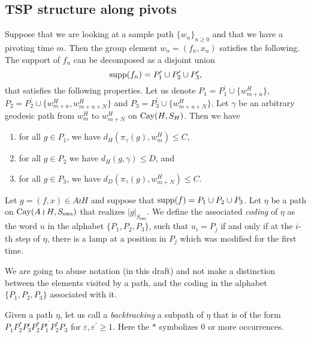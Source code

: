 \subsection{TSP structure along pivots}

\begin{prop}\label{prop: structure along pivots}
	Suppose that we are looking at a sample path $\{w_n\}_{n\ge 0}$ and that we have a pivoting time $m$. Then the group element $w_n=(f_n,x_n)$ satisfies the following. The support of $f_n$ can be decomposed as a disjoint union
	\[\mathrm{supp}(f_n)=P^{\prime}_1\cup P^{\prime}_2\cup P^{\prime}_3,\]
	that satisfies the following properties. Let us denote $P_1=P^{\prime}_1\cup\{w^{H}_{m+u}\}$, $P_2=P^{\prime}_2\cup \{w^{H}_{m+u}, w^{H}_{m+u+N}\}$ and  $P_3=P^{\prime}_3\cup \{w^{H}_{m+u+N}\}$. Let  $\gamma$ be an arbitrary geodesic path from $w_m^{H}$ to $w^{H}_{m+N}$ on $\mathrm{Cay}(H,S_H)$. Then we have
	\begin{enumerate}
		\item for all $g\in P_1$, we have $d_H\left( \pi_{\gamma}(g) ,w_m^H  \right)\le C$,
		\item for all $g\in P_2$ we have $d_H(g,\gamma)\le D$, and
		\item for all $g\in P_3$, we have $d_D\left( \pi_{\gamma}(g),w^H_{m+N} \right)\le C$.
	\end{enumerate}
\end{prop}


\begin{defin}
	 Let $g=(f,x)\in A\wr H$ and suppose that $\mathrm{supp}(f)=P_1\cup P_2\cup P_3$. Let $\eta$ be a path on $\mathrm{Cay}(A\wr H,S_{\mathrm{sws}})$ that realizes $|g|_{S_{\mathrm{sws}}}$. We define the associated \emph{coding} of $\eta$ as the word $u$ in the alphabet $\{P_1,P_2,P_3\}$, such that $u_i=P_j$ if and only if at the $i$-th step of $\eta$, there is a lamp at a position in $P_j$ which was modified for the first time.
\end{defin}

We are going to abuse notation (in this draft) and not make a distinction between the elements visited by a path, and the coding in the alphabet $\{P_1,P_2,P_3\}$ associated with it.
\begin{defin}
	Given a path $\eta$, let us call a \emph{backtracking} a subpath of $\eta$ that is of the form $P_1P_2^{*}P_3^{\varepsilon}P_2^{*}P_1^{\varepsilon^{\prime}}P_2^{*}P_3$ for $\varepsilon, \varepsilon^{\prime}\ge 1$. Here the $*$ symbolizes $0$ or more occurrences.
\end{defin}

